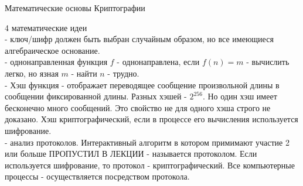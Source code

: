 \begin{title}
	Математические основы Криптографии
\end{title}

4 математические идеи\\

 - ключ/шифр должен быть выбран случайным образом, но все
имеющиеся алгебраическое основание.\\
 - однонаправленная функция $f$ - однонаправлена, если
$f(n) = m$ - вычислить легко, но язная $m$ - найти $n$ - трудно.\\
 - Хэш функция - отображает переводящее сообщение произвольной
длины в сообщении фиксированной длины. Разных хэшей - $2^256$. Но один хэш имеет
бесконечно много сообщений. Это свойство не для одного хэша  строго не доказано.
Хэш криптографический, если в процессе его вычисления используется шифрование.\\
 - анализ протоколов. Интерактивный алгоритм в котором
примимают участие 2 или больше ПРОПУСТИЛ В ЛЕКЦИИ - называется протоколом.
Если используется шифрование, то протокол - криптографический. Все компьютерные
процессы - осуществляется посредством протокола.